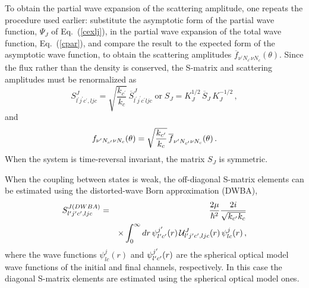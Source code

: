 To obtain the partial wave expansion of the scattering amplitude, one
repeats the procedure used earlier: substitute the asymptotic form of the
partial wave function, $\Psi_{J}$ of Eq.~(\ref{cexlj}), in the partial wave
expansion of the total wave function, Eq.~(\ref{cpar}), and compare the
result to the expected form of the asymptotic wave function, to obtain the
scattering amplitudes $\overline{f}_{\nu^{\prime}N_{c^{\prime}}\nu
N_{c}}(\theta) $. Since the flux rather than the density is conserved, the
S-matrix and scattering amplitudes must be renormalized as 
\begin{equation}
S_{l^{\prime}j^{\prime}c^{\prime},ljc}^{J}=\sqrt{\frac{k_{c^{\prime}}}{k_{c}}%
}\,\overline{S}_{l^{\prime}j^{\prime}c^{\prime}ljc}^{J}\;\text{or}\;
S_{J}=K_{J}^{1/2}\,\overline{S}_{J}\, K_{J}^{-1/2}\,,
\end{equation}
and 
\begin{equation}
f_{\nu^{\prime}N_{c^{\prime}}\nu N_{c}}(\theta)=\sqrt{\frac{k_{c^{\prime}}}{%
k_{c}}}\,\overline{f}_{\nu^{\prime}N_{c^{\prime}}\nu N_{c}}(\theta)\,.
\end{equation}
When the system is time-reversal invariant, the matrix $S_{J}$ is symmetric.

When the coupling between states is weak, the off-diagonal S-matrix elements
can be estimated using the distorted-wave Born approximation (DWBA), 
\begin{eqnarray}
S_{l^{\prime}j^{\prime}c^{\prime},ljc}^{J(DWBA)} & = & \frac{2\mu}{\hbar^2}%
\frac{2i}{\sqrt{k_{c^{\prime}}k_c}} \\
& & \times \int_0^{\infty}dr\, \psi_{l^{\prime}c^{\prime}}^{j^{\prime}}(r)\,{%
\mathcal{U}}_{l^{\prime}j^{\prime}c^{\prime},ljc}^{J}(r)\,\psi_{lc}^{j}(r)\,,
\notag
\end{eqnarray}
where the wave functions $\psi_{lc}^{j}(r)$ and $\psi_{l^{\prime}c^{%
\prime}}^{j^{\prime}}(r)$ are the spherical optical model wave functions of
the initial and final channels, respectively. In this case the diagonal
S-matrix elements are estimated using the spherical optical model ones.

